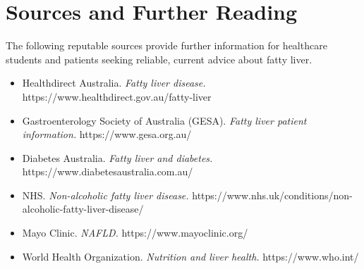 \section*{Sources and Further Reading}
The following reputable sources provide further information for healthcare students and patients seeking reliable, current advice about fatty liver.
\begin{itemize}
    \item Healthdirect Australia. \textit{Fatty liver disease.} https://www.healthdirect.gov.au/fatty-liver
    \item Gastroenterology Society of Australia (GESA). \textit{Fatty liver patient information.} https://www.gesa.org.au/
    \item Diabetes Australia. \textit{Fatty liver and diabetes.} https://www.diabetesaustralia.com.au/
    \item NHS. \textit{Non-alcoholic fatty liver disease.} https://www.nhs.uk/conditions/non-alcoholic-fatty-liver-disease/
    \item Mayo Clinic. \textit{NAFLD.} https://www.mayoclinic.org/
    \item World Health Organization. \textit{Nutrition and liver health.} https://www.who.int/
\end{itemize}
